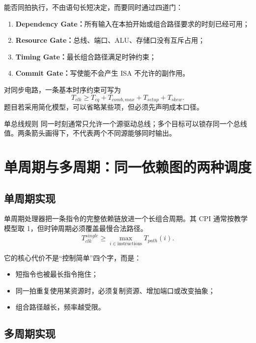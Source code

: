 \documentclass[UTF8,fontset=fandol,11pt,a4paper]{ctexart}
\newcommand{\kw}[1]{\textbf{\color{deep}#1}}
\begin{document}
能否同拍执行，不由语句长短决定，而要同时通过四道门：
\begin{enumerate}
  \item \kw{Dependency Gate：}所有输入在本拍开始或组合路径要求的时刻已经可用；
  \item \kw{Resource Gate：}总线、端口、ALU、存储口没有互斥占用；
  \item \kw{Timing Gate：}最长组合路径满足时钟约束；
  \item \kw{Commit Gate：}写使能不会产生 ISA 不允许的副作用。
\end{enumerate}

对同步电路，一条基本时序约束可写为
\[
T_{clk}\ge T_{cq}+T_{comb,max}+T_{setup}+T_{skew}.
\]
题目若采用简化模型，可以省略某些项，但必须先声明成本口径。

\begin{warnbox}{单总线规则}
同一时刻通常只允许一个源驱动总线；多个目标可以锁存同一个总线值。两条箭头画得下，不代表两个不同源能够同时输出。
\end{warnbox}

\begin{center}

\end{center}

\section{单周期与多周期：同一依赖图的两种调度}

\subsection{单周期实现}

单周期处理器把一条指令的完整依赖链放进一个长组合周期。其 CPI 通常按教学模型取 1，但时钟周期必须覆盖最慢合法路径。
\[
T_{clk}^{single}\ge\max_{i\in\text{instructions}}T_{path}(i).
\]

它的核心代价不是“控制简单”四个字，而是：
\begin{itemize}
  \item 短指令也被最长指令拖住；
  \item 同一拍重复使用某资源时，必须复制资源、增加端口或改变抽象；
  \item 组合路径越长，频率越受限。
\end{itemize}

\subsection{多周期实现}
\end{document}
